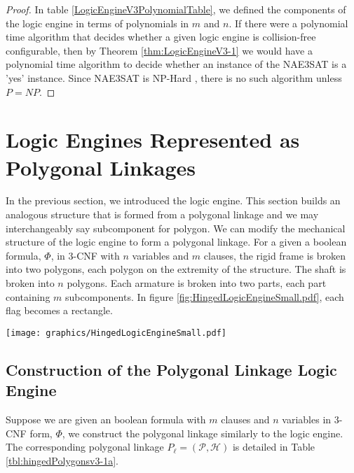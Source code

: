 \documentclass[10pt]{CSUNthesis}
\theoremstyle{plain}%
\theoremstyle{definition}
\theoremstyle{remark}
\newcommand{\HH}{{\mathcal{H}}} %
\renewcommand{\PP}{{\mathcal{P}}} %
\begin{document}
\begin{proof}
In table \ref{LogicEngineV3PolynomialTable}, we defined the components of the logic engine in terms of polynomials in $m$ and $n$. 
If there were a polynomial time algorithm that decides whether a given logic engine is collision-free configurable, then by Theorem \ref{thm:LogicEngineV3-1} we would have a polynomial time algorithm to decide whether an instance of the NAE3SAT is a 'yes' instance.  
Since NAE3SAT is NP-Hard \cite{NAE3SATisNPhard}, there is no such algorithm unless $P = NP$.
\end{proof}\section{Logic Engines Represented as Polygonal Linkages}   
In the previous section, we introduced the logic engine.  
This section builds an analogous structure that is formed from a polygonal linkage and we may interchangeably say subcomponent for polygon.
We can modify the mechanical structure of the logic engine to form a polygonal linkage.  
For a given a boolean formula, $\Phi$, in 3-CNF with $n$ variables and $m$ clauses,
the rigid frame is broken into two polygons, each polygon on the extremity of the structure.
The shaft is broken into $n$ polygons.
Each armature is broken into two parts, each part containing $m$ subcomponents.
In figure \ref{fig:HingedLogicEngineSmall.pdf}, each flag becomes a rectangle.

\begin{minipage}{\linewidth}
\begin{center}
\texttt{[image: graphics/HingedLogicEngineSmall.pdf]}
\label{fig:HingedLogicEngineSmall.pdf}
\end{center}
\end{minipage}

\subsection{Construction of the Polygonal Linkage Logic Engine}
Suppose we are given an boolean formula with $m$ clauses and $n$ variables in 3-CNF form, $\Phi$, we construct the polygonal linkage similarly to the logic engine.
The corresponding polygonal linkage $P_\ell = (\PP,\HH)$ is detailed in Table \ref{tbl:hingedPolygonsv3-1a}.
\end{document}
